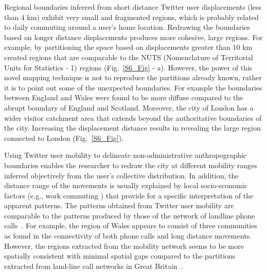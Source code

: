 \documentclass[]{tGIS2e}
\begin{document}
Regional boundaries inferred from short distance Twitter user displacements (less than 4 km) exhibit very small and fragmented regions, which is probably related to daily commuting around a user's home location. 
Redrawing the boundaries based on longer distance displacements produces more cohesive, large regions.
For example, by partitioning the space based on displacements greater than 10 km created regions that are comparable to the NUTS (Nomenclature of Territorial Units for Statistics - 1) regions (Fig.~\ref{S6_Fig} - a). 
However, the power of this novel mapping technique is not to reproduce the partitions already known, rather it is to point out some of the unexpected boundaries.
For example the boundaries between England and Wales were found to be more diffuse compared to the abrupt boundary of England and Scotland.
Moreover, the city of London has a wider visitor catchment area that extends beyond the authoritative boundaries of the city.
Increasing the displacement distance results in revealing the large region connected to London (Fig.~\ref{S6_Fig}). 

Using Twitter user mobility to delineate non-administrative anthropographic boundaries enables the researcher to redraw the city at different mobility ranges inferred objectively from the user's collective distribution. 
In addition, the distance range of the movements is usually explained by local socio-economic factors (e.g., work commuting ) that provide for a specific interpretation of the apparent patterns.
The patterns obtained from Twitter user mobility are comparable to the patterns produced by those of the network of landline phone calls~\citep{ratti2010}.
For example, the region of Wales appears to consist of three communities as found in the connectivity of both phone calls and long distance movements. 
However, the regions extracted from the mobility network seems to be more spatially consistent with minimal spatial gaps compared to the partitions extracted from land-line call networks in Great Britain~\citep{ratti2010}.
\end{document}
